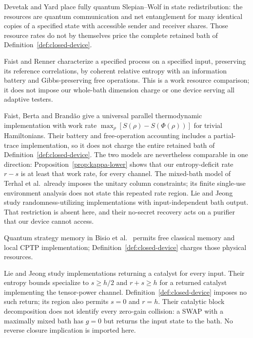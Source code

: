 \documentclass[11pt,a4paper]{article}
\numberwithin{equation}{section}
\theoremstyle{plain}
\theoremstyle{definition}
\begin{document}
Devetak and Yard \cite[main region and Eqs.~(1)--(2)]{DevetakYard2008}
place fully quantum
Slepian--Wolf in state redistribution: the resources are quantum communication
and net entanglement for many identical copies of a specified state with
accessible sender and receiver shares. Those resource rates do not by
themselves price the complete retained bath of
Definition~\ref{def:closed-device}.

Faist and Renner \cite[Main Result and Eq.~(2)]{FaistRenner2018}
characterize a specified
process on a specified input, preserving its reference correlations, by
coherent relative entropy with an information battery and Gibbs-preserving
free operations. This is a work resource comparison; it does not impose our
whole-bath dimension charge or one device serving all adaptive testers.

Faist, Berta and Brand\~ao \cite[Theorem 5.1 and Eq.~(5.4)]{Faist2019}
give a universal parallel
thermodynamic implementation with work rate
$\max_\rho[S(\rho)-S(\Phi(\rho))]$ for trivial Hamiltonians. Their battery and
free-operation accounting includes a partial-trace implementation, so it does
not charge the entire retained bath of
Definition~\ref{def:closed-device}. The two models are nevertheless comparable
in one direction: Proposition~\ref{prop:kappa-lower} shows that our
entropy-deficit rate $r-s$ is at least that work rate, for every channel. The
mixed-bath model of Terhal et al.\ already imposes the unitary column
constraints; its finite single-use environment analysis does not state this
repeated rate region. Lie and Jeong \cite[Theorems 1, 5--6]{LieJeong2021} study
randomness-utilizing implementations with input-independent bath output. That
restriction is absent here, and their no-secret recovery acts on a purifier
that our device cannot access.

Quantum strategy memory in Bisio et al.\
\cite[Definitions 3--4 and Theorem 3]{Bisio2012} permits free classical memory
and local CPTP implementation; Definition~\ref{def:closed-device} charges
those physical resources.

Lie and Jeong \cite[Proposition 2, Corollary 10 and Theorem 11]{LieJeongCatalytic2021}
study implementations returning a catalyst for every input. Their entropy
bounds specialize to $s\ge h/2$ and $r+s\ge h$ for a returned catalyst implementing
the tensor-power channel. Definition~\ref{def:closed-device} imposes no such return;
its region also permits $s=0$ and $r=h$. Their catalytic block decomposition
does not identify every zero-gain collision: a SWAP with a maximally mixed bath
has $g=0$ but returns the input state to the bath. No reverse closure implication
is imported here.
\end{document}
